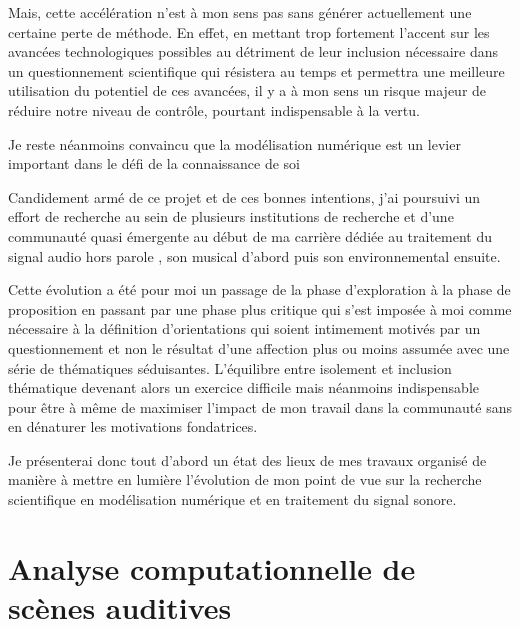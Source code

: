 Mais, cette accélération n'est à mon sens pas sans générer actuellement une certaine perte de méthode. En effet, en mettant trop fortement l'accent sur les avancées technologiques possibles au détriment de leur inclusion nécessaire dans un questionnement scientifique qui résistera au temps et permettra une meilleure utilisation du potentiel de ces avancées, il y a à mon sens un risque majeur de réduire notre niveau de contrôle, pourtant indispensable à la vertu.

Je reste néanmoins convaincu que la modélisation numérique est un levier important dans le défi de la connaissance de soi

Candidement armé de ce projet et de ces bonnes intentions, j'ai poursuivi un effort de recherche au sein de plusieurs institutions de recherche et d'une communauté quasi émergente au début de ma carrière dédiée au traitement du signal audio \og hors parole \fg, son musical d'abord puis son environnemental ensuite. %

Cette évolution a été pour moi un passage de la phase d'exploration à la phase de proposition en passant par une phase plus critique qui s'est imposée à moi comme nécessaire à la définition d'orientations qui soient intimement motivés par un questionnement et non le résultat d'une affection plus ou moins assumée avec une série de thématiques séduisantes. L'équilibre entre isolement et inclusion thématique devenant alors un exercice difficile mais néanmoins indispensable pour être à même de maximiser l'impact de mon travail dans la communauté sans en dénaturer les motivations fondatrices.

Je présenterai donc tout d'abord un état des lieux de mes travaux organisé de manière à mettre en lumière l'évolution de mon point de vue sur la recherche scientifique en modélisation numérique et en traitement du signal sonore. %


\section{Analyse computationnelle de scènes auditives} \label{sec:asa}

